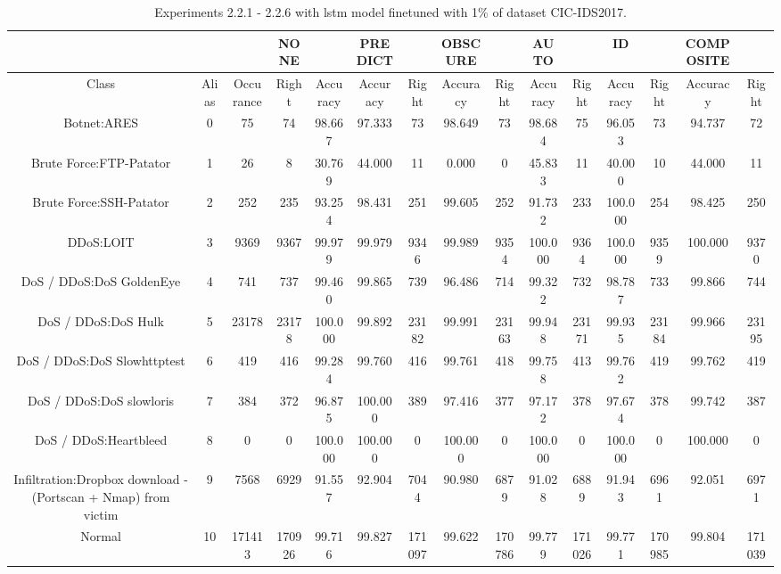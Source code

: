 \begin{table}[htb]
    \centering
    \caption{Experiments 2.2.1 - 2.2.6 with \gls{lstm} model finetuned with 1\% of dataset CIC-IDS2017.}
    \label{table:results:lstm:flows_1}
    \begin{tabular}{@{}ccccccccccccccc@{}}
        \toprule
         &  &  & NONE &  & PREDICT &  & OBSCURE &  & AUTO &  & ID &  & COMPOSITE &  \\
        \midrule
        Class &  Alias &  Occurance &  Right &  Accuracy &  Accuracy &  Right &  Accuracy &  Right &  Accuracy &  Right &  Accuracy &  Right &  Accuracy &  Right \\
        Botnet:ARES &  0 &  75 &  74 &  98.667 &  97.333 &  73 &  98.649 &  73 &  98.684 &  75 &  96.053 &  73 &  94.737 &  72 \\
        Brute Force:FTP-Patator &  1 &  26 &  8 &  30.769 &  44.000 &  11 &  0.000 &  0 &  45.833 &  11 &  40.000 &  10 &  44.000 &  11 \\
        Brute Force:SSH-Patator &  2 &  252 &  235 &  93.254 &  98.431 &  251 &  99.605 &  252 &  91.732 &  233 &  100.000 &  254 &  98.425 &  250 \\
        DDoS:LOIT &  3 &  9369 &  9367 &  99.979 &  99.979 &  9346 &  99.989 &  9354 &  100.000 &  9364 &  100.000 &  9359 &  100.000 &  9370 \\
        DoS / DDoS:DoS GoldenEye &  4 &  741 &  737 &  99.460 &  99.865 &  739 &  96.486 &  714 &  99.322 &  732 &  98.787 &  733 &  99.866 &  744 \\
        DoS / DDoS:DoS Hulk &  5 &  23178 &  23178 &  100.000 &  99.892 &  23182 &  99.991 &  23163 &  99.948 &  23171 &  99.935 &  23184 &  99.966 &  23195 \\
        DoS / DDoS:DoS Slowhttptest &  6 &  419 &  416 &  99.284 &  99.760 &  416 &  99.761 &  418 &  99.758 &  413 &  99.762 &  419 &  99.762 &  419 \\
        DoS / DDoS:DoS slowloris &  7 &  384 &  372 &  96.875 &  100.000 &  389 &  97.416 &  377 &  97.172 &  378 &  97.674 &  378 &  99.742 &  387 \\
        DoS / DDoS:Heartbleed &  8 &  0 &  0 &  100.000 &  100.000 &  0 &  100.000 &  0 &  100.000 &  0 &  100.000 &  0 &  100.000 &  0 \\
        Infiltration:Dropbox download - (Portscan + Nmap) from victim &  9 &  7568 &  6929 &  91.557 &  92.904 &  7044 &  90.980 &  6879 &  91.028 &  6889 &  91.943 &  6961 &  92.051 &  6971 \\
        Normal &  10 &  171413 &  170926 &  99.716 &  99.827 &  171097 &  99.622 &  170786 &  99.779 &  171026 &  99.771 &  170985 &  99.804 &  171039 \\

\end{tabular}
\end{table}
